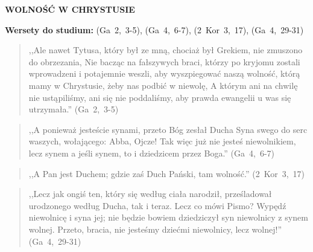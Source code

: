 \documentclass[10pt,a4paper,oneside]{article}
\begin{document}
\centerline{\textbf{\MakeUppercase{Wolność w Chrystusie}}}
\begin{center}
\textbf{Wersety do studium:} (Ga~2,~3-5), (Ga~4,~6-7), (2~Kor~3,~17), (Ga~4,~29-31)
\end{center}
\begin{quote}
,,Ale nawet Tytusa, który był ze mną, chociaż był Grekiem, nie zmuszono do obrzezania, Nie bacząc na fałszywych braci, którzy po kryjomu zostali wprowadzeni i potajemnie weszli, aby wyszpiegować naszą wolność, którą mamy w Chrystusie, żeby nas podbić w niewolę, A którym ani na chwilę nie ustąpiliśmy, ani się nie poddaliśmy, aby prawda ewangelii u was się utrzymała.'' (Ga~2,~3-5)
\end{quote}
\begin{quote}
,,A ponieważ jesteście synami, przeto Bóg zesłał Ducha Syna swego do serc waszych, wołającego: Abba, Ojcze! Tak więc już nie jesteś niewolnikiem, lecz synem a jeśli synem, to i dziedzicem przez Boga.'' (Ga~4,~6-7)
\end{quote}
\begin{quote}
,,A Pan jest Duchem; gdzie zaś Duch Pański, tam wolność.'' (2~Kor~3,~17)
\end{quote}
\begin{quote}
,,Lecz jak ongiś ten, który się według ciała narodził, prześladował urodzonego według Ducha, tak i teraz. Lecz co mówi Pismo? Wypędź niewolnicę i syna jej; nie będzie bowiem dziedziczył syn niewolnicy z synem wolnej. Przeto, bracia, nie jesteśmy dziećmi niewolnicy, lecz wolnej!'' (Ga~4,~29-31)
\end{quote}
\end{document}
